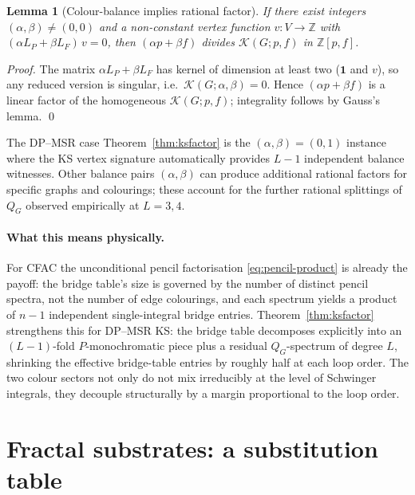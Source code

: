 \documentclass[11pt,a4paper]{article}
\theoremstyle{plain}
\newtheorem{lemma}[theorem]{Lemma}
\begin{document}
\begin{lemma}[Colour-balance implies rational factor]
\label{lem:colour-balance}
If there exist integers $(\alpha, \beta) \neq (0,0)$ and a
non-constant vertex function $v : V \to \mathbb{Z}$ with
$(\alpha L_P + \beta L_F)\,v = 0$, then
$(\alpha p + \beta f)$ divides $\mathcal{K}(G;p,f)$ in $\mathbb{Z}[p,f]$.
\end{lemma}

\begin{proof}[Proof]
The matrix $\alpha L_P + \beta L_F$ has kernel of dimension at
least two ($\mathbf 1$ and $v$), so any reduced version is
singular, i.e.\ $\mathcal{K}(G; \alpha, \beta) = 0$.  Hence
$(\alpha p + \beta f)$ is a linear factor of the homogeneous
$\mathcal{K}(G;p,f)$; integrality follows by Gauss's lemma.  \qed
\end{proof}

The DP--MSR case Theorem~\ref{thm:ksfactor} is the
$(\alpha, \beta) = (0, 1)$ instance where the KS vertex signature
automatically provides $L - 1$ independent balance witnesses.
Other balance pairs $(\alpha, \beta)$ can produce additional
rational factors for specific graphs and colourings; these
account for the further rational splittings of $Q_G$ observed
empirically at $L = 3, 4$.

\paragraph{What this means physically.}
For CFAC the unconditional pencil factorisation
\eqref{eq:pencil-product} is already the payoff: the bridge
table's size is governed by the number of distinct pencil spectra,
not the number of edge colourings, and each spectrum yields a
product of $n{-}1$ independent single-integral bridge entries.
Theorem~\ref{thm:ksfactor} strengthens this for DP--MSR KS: the
bridge table decomposes explicitly into an $(L-1)$-fold
$P$-monochromatic piece plus a residual $Q_G$-spectrum of degree
$L$, shrinking the effective bridge-table entries by roughly half
at each loop order.  The two colour sectors not only do not mix
irreducibly at the level of Schwinger integrals, they decouple
structurally by a margin proportional to the loop order.

\section{Fractal substrates: a substitution table}
\label{sec:spectral}
\end{document}
